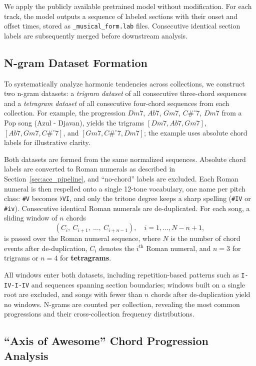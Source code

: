 \documentclass{article}
\begin{document}
We apply the publicly available pretrained model without modification. For each track, the model outputs a sequence of labeled sections with their onset and offset times, stored as \texttt{\_musical\_form.lab} files. Consecutive identical section labels are subsequently merged before downstream analysis.

\subsection{N-gram Dataset Formation}
\label{sec:ngram_generation}
To systematically analyze harmonic tendencies across collections, we construct two n-gram datasets: a \textit{trigram dataset} of all consecutive three-chord sequences and a \textit{tetragram dataset} of all consecutive four-chord sequences from each collection. For example, the progression $Dm7$, $Ab7$, $Gm7$, $C\#^{\circ}7$, $Dm7$ from a Pop song (Azul - Djavan), yields the trigrams $[Dm7, Ab7, Gm7]$, $[Ab7, Gm7, C\#^{\circ}7]$, and $[Gm7, C\#^{\circ}7, Dm7]$; the example uses absolute chord labels for illustrative clarity.

Both datasets are formed from the same normalized sequences. Absolute chord labels are converted to Roman numerals as described in Section~\ref{sec:ace_pipeline}, and ``no-chord'' labels are excluded. Each Roman numeral is then respelled onto a single 12-tone vocabulary, one name per pitch class: \texttt{\#V} becomes $\flat$\texttt{VI}, and only the tritone degree keeps a sharp spelling (\texttt{\#IV} or \texttt{\#iv}). Consecutive identical Roman numerals are de-duplicated. For each song, a sliding window of $n$ chords
\[
    (C_{i},\ C_{i+1},\ \ldots,\ C_{i+n-1}), \quad i = 1, \ldots, N-n+1,
\]
is passed over the Roman numeral sequence, where $N$ is the number of chord events after de-duplication, $C_i$ denotes the $i^{\text{th}}$ Roman numeral, and $n=3$ for trigrams or $n=4$ for \textbf{tetragrams}.

All windows enter both datasets, including repetition-based patterns such as \texttt{I-IV-I-IV} and sequences spanning section boundaries; windows built on a single root are excluded, and songs with fewer than $n$ chords after de-duplication yield no windows. N-grams are counted per collection, revealing the most common progressions and their cross-collection frequency distributions.

\subsection{``Axis of Awesome'' Chord Progression Analysis}
\label{sec:axis}
\end{document}
